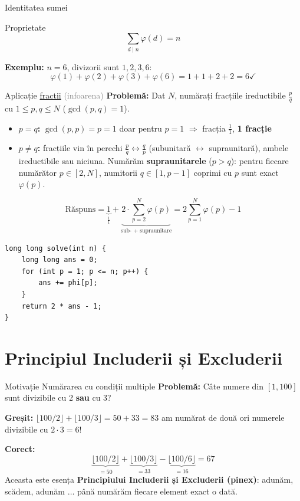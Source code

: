 \documentclass[10pt]{beamer}
\begin{document}
\begin{frame}{Identitatea sumei}
  \begin{block}{Proprietate}
    \[
      \sum_{d \mid n} \varphi(d) = n
    \]
  \end{block}
  \smallskip
  \textbf{Exemplu:} $n = 6$, divizorii sunt $1, 2, 3, 6$:
  \[
    \varphi(1)+\varphi(2)+\varphi(3)+\varphi(6) = 1+1+2+2 = 6 \checkmark
  \]
\end{frame}

\begin{frame}[fragile]{Aplicație \textemdash{} \href{https://www.infoarena.ro/problema/fractii}{fractii} \textcolor{gray}{(infoarena)}}
  \textbf{Problemă:} Dat $N$, numărați fracțiile ireductibile $\frac{p}{q}$
  cu $1 \leq p, q \leq N$ ($\gcd(p,q) = 1$).
  \begin{itemize}\itemsep3pt
    \item \textbf{$p = q$:} $\gcd(p, p) = p = 1$ doar pentru $p = 1$
      $\Rightarrow$ fracția $\frac{1}{1}$, \textbf{1 fracție}
    \item \textbf{$p \neq q$:} fracțiile vin în perechi
      $\frac{p}{q} \leftrightarrow \frac{q}{p}$ (subunitară $\leftrightarrow$ supraunitară),
      ambele ireductibile sau niciuna.
      Numărăm \textbf{supraunitarele} ($p > q$): pentru fiecare numărător $p \in [2, N]$,
      numitorii $q \in [1, p-1]$ coprimi cu $p$ sunt exact $\varphi(p)$.
  \end{itemize}
  \[
    \text{Răspuns}
    = \underbrace{1}_{\frac{1}{1}}
    + \underbrace{2 \cdot \sum_{p=2}^{N} \varphi(p)}_{\text{sub- + supraunitare}}
    = 2\sum_{p=1}^{N} \varphi(p) - 1
  \]
  \begin{lstlisting}
long long solve(int n) {
    long long ans = 0;
    for (int p = 1; p <= n; p++) {
        ans += phi[p];
    }
    return 2 * ans - 1;
}
  \end{lstlisting}
\end{frame}

\section{Principiul Includerii și Excluderii}

\begin{frame}{Motivație \textemdash{} Numărarea cu condiții multiple}
  \textbf{Problemă:} Câte numere din $[1, 100]$ sunt divizibile cu 2 \textbf{sau} cu 3?
  \smallskip

  \textbf{Greșit:} $\lfloor 100/2 \rfloor + \lfloor 100/3 \rfloor = 50 + 33 = 83$
  \textemdash{} am numărat de două ori numerele divizibile cu $2 \cdot 3 = 6$!
  \smallskip

  \textbf{Corect:}
  \[
    \underbrace{\lfloor 100/2 \rfloor}_{=50}
    + \underbrace{\lfloor 100/3 \rfloor}_{=33}
    - \underbrace{\lfloor 100/6 \rfloor}_{=16}
    = 67
  \]
  \smallskip
  Aceasta este esența \textbf{Principiului Includerii și Excluderii (pinex)}:
  adunăm, scădem, adunăm $\ldots$ până numărăm fiecare element exact o dată.
\end{frame}
\end{document}
